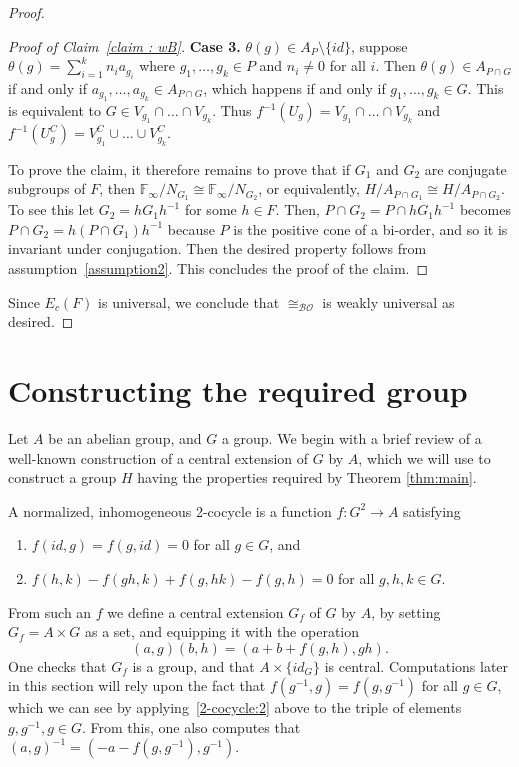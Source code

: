 \documentclass{amsart}
\theoremstyle{definition}
\theoremstyle{remark}
\begin{document}
\begin{proof}
\begin{proof}[Proof of Claim~\ref{claim : wB}]
\noindent \textbf{Case 3.}  $\theta(g) \in A_P \setminus \{id\}$, suppose $\theta(g) = \sum_{i=1}^k n_i a_{g_i}$ where $g_1, \ldots, g_k \in P$ and $n_i \neq 0$ for all $i$.  Then $\theta(g) \in  A_{P \cap G}$ if and only if $a_{g_1}, \ldots, a_{g_k} \in A_{P \cap G}$, which happens if and only if $g_1, \ldots, g_k \in G$.  This is equivalent to $G \in V_{g_1} \cap \ldots \cap V_{g_k}$.  Thus $f^{-1}(U_g) = V_{g_1} \cap \ldots \cap V_{g_k}$ and $f^{-1}(U_g^C) = V_{g_1}^C \cup \ldots \cup V_{g_k}^C$.


    
    To prove the claim, it therefore remains to prove that if \(G_1\) and \(G_2\) are conjugate subgroups of $F$, then $\mathbb{F}_\infty/N_{G_1} \cong \mathbb{F}_\infty/N_{G_2}$, or equivalently, \(H/A_{P\cap G_1} \cong H/A_{P\cap G_2}\). To see this let \(G_2 = hG_1 h^{-1}\) for some \(h\in F\). Then,
    \(P\cap G_2 = P\cap hG_1h^{-1}\) becomes
    \(P\cap G_2 = h(P\cap G_1)h^{-1}\) because \(P\) is the positive cone of a bi-order, and so it is invariant under conjugation. Then the desired property follows from assumption~\eqref{assumption2}.  This concludes the proof of the claim.
\end{proof}

Since \(E_c(F)\) is universal, we conclude that \(\cong_\mathcal{BO}\) is weakly universal as desired.
\end{proof}



\section{Constructing the required group}
\label{sec:cocycle}

Let $A$ be an abelian group, and $G$ a group.  We begin with a brief review of a well-known construction of a central extension of $G$ by $A$, which we will use to construct a group $H$ having the properties required by Theorem \ref{thm:main}.

A normalized, inhomogeneous 2-cocycle is a function $f : G^2 \rightarrow A$ satisfying \begin{enumerate}
    \item $f(id, g) = f(g, id) = 0$ for all $g \in G$, and
    \item \label{2-cocycle:2} $f(h, k) - f(gh, k) + f(g, hk) - f(g,h) = 0$ for all $g, h, k \in G$.
\end{enumerate}
  From such an $f$ we define a central extension $G_f$ of $G$ by $A$, by setting $G_f = A \times G$ as a set, and equipping it with the operation
\[ (a, g) (b, h) = (a+b+f(g,h), gh).
\]
One checks that $G_f$ is a group, and that $A \times \{id_G\}$ is central.  Computations later in this section will rely upon the fact that $f(g^{-1}, g) = f(g, g^{-1})$ for all $g \in G$, which we can see by applying~\eqref{2-cocycle:2} above to the triple of elements $g, g^{-1}, g \in G$. From this, one also computes that $(a, g)^{-1} = (-a-f(g,g^{-1}), g^{-1})$.
\end{document}

